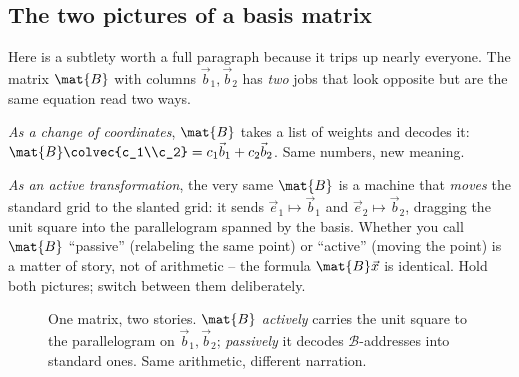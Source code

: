 \subsection{The two pictures of a basis matrix}
\label{ch31:two-pictures}

Here is a subtlety worth a full paragraph because it trips up nearly everyone. The
matrix $\mat{B}$ with columns $\vec{b}_1,\vec{b}_2$ has \emph{two} jobs that look
opposite but are the same equation read two ways.

\emph{As a change of coordinates}, $\mat{B}$ takes a list of weights and decodes
it: $\mat{B}\colvec{c_1\\c_2}=c_1\vec{b}_1+c_2\vec{b}_2$. Same numbers, new
meaning.

\emph{As an active transformation}, the very same $\mat{B}$ is a machine that
\emph{moves} the standard grid to the slanted grid: it sends $\vec{e}_1\mapsto\vec{b}_1$
and $\vec{e}_2\mapsto\vec{b}_2$, dragging the unit square into the parallelogram
spanned by the basis. Whether you call $\mat{B}$ ``passive'' (relabeling the same
point) or ``active'' (moving the point) is a matter of story, not of arithmetic --
the formula $\mat{B}\vec{x}$ is identical. Hold both pictures; switch between them
deliberately.

\begin{figure}[H]
\centering
{}
\caption{One matrix, two stories. $\mat{B}$ \emph{actively} carries the unit
square to the parallelogram on $\vec{b}_1,\vec{b}_2$; \emph{passively} it decodes
$\mathcal{B}$-addresses into standard ones. Same arithmetic, different narration.}
\label{ch31:fig-active-passive}
\end{figure}

